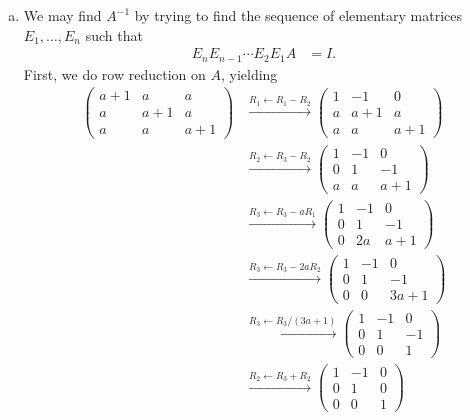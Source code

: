 \documentclass[10pt]{mypackage}
\begin{document}
\begin{solution}\hfill
  \begin{enumerate}[(a)]
    \item We may find $A^{-1}$ by trying to find the sequence of elementary matrices $E_1,\dots,E_n$ such that
      \begin{align*}
        E_nE_{n-1}\cdots E_2E_1 A &= I.
      \end{align*}
      First, we do row reduction on $A$, yielding
      \begin{align*}
        \begin{pmatrix}a+1 & a & a \\ a & a+1 & a \\ a & a & a+1\end{pmatrix} &\xrightarrow{R_1 \leftarrow R_1-R_2} \begin{pmatrix}1 & -1 & 0 \\ a & a+1 & a \\ a & a & a+1\end{pmatrix} \\
                           &\xrightarrow{R_2 \leftarrow R_3-R_2}\begin{pmatrix}1 & -1 & 0 \\ 0 & 1 & -1 \\ a & a & a+1\end{pmatrix}\\
                           &\xrightarrow{R_3 \leftarrow R_3 - aR_1} \begin{pmatrix}1 & -1 & 0 \\ 0 & 1 & -1 \\ 0 & 2a & a+1 \end{pmatrix}\\
                           &\xrightarrow{R_3 \leftarrow R_3 - 2aR_2} \begin{pmatrix}1 & -1 & 0 \\ 0 & 1 & -1 \\ 0 & 0 & 3a+1\end{pmatrix}\\
                           &\xrightarrow{R_3 \leftarrow R_3/(3a+1)} \begin{pmatrix}1 & -1 & 0 \\ 0 & 1 & -1 \\ 0 & 0 & 1\end{pmatrix}\\
                           &\xrightarrow{R_2 \leftarrow R_3 + R_2} \begin{pmatrix}1 & -1 & 0 \\ 0 & 1 & 0 \\ 0 & 0 & 1\end{pmatrix}\\

\end{align*}
\end{enumerate}
\end{solution}
\end{document}
